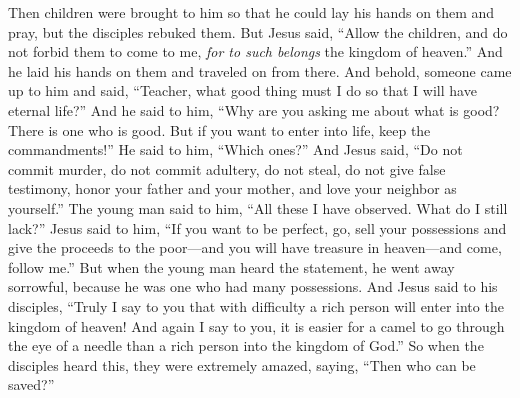 \begin{biblechapter}
 Then children were brought to him so that he could lay his hands on them and pray, but the disciples rebuked them.
\verse But Jesus said, “Allow the children, and do not forbid them to come to me, \textit{for to such belongs} the kingdom of heaven.”
\verse And he laid his hands on them and traveled on from there.
 And behold, someone came up to him and said, “Teacher, what good thing must I do so that I will have eternal life?”
\verse And he said to him, “Why are you asking me about what is good? There is one who is good. But if you want to enter into life, keep the commandments!”
\verse He said to him, “Which ones?” And Jesus said, “Do not commit murder, do not commit adultery, do not steal, do not give false testimony,
\verse honor your father and your mother, and love your neighbor as yourself.”
\verse The young man said to him, “All these I have observed. What do I still lack?”
\verse Jesus said to him, “If you want to be perfect, go, sell your possessions and give the proceeds to the poor—and you will have treasure in heaven—and come, follow me.”
\verse But when the young man heard the statement, he went away sorrowful, because he was one who had many possessions.
\verse And Jesus said to his disciples, “Truly I say to you that with difficulty a rich person will enter into the kingdom of heaven!
\verse And again I say to you, it is easier for a camel to go through the eye of a needle than a rich person into the kingdom of God.”
\verse So when the disciples heard this, they were extremely amazed, saying, “Then who can be saved?”

\end{biblechapter}
